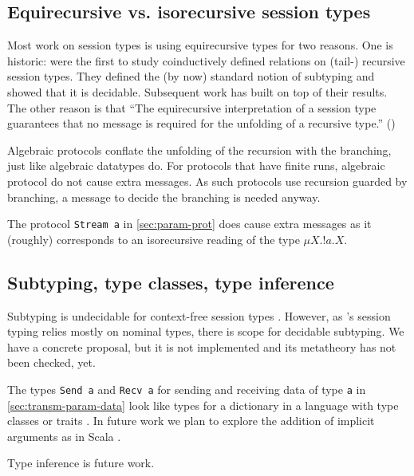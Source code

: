 \subsection{Equirecursive vs. isorecursive session types}
\label{sec:this-session-types}
Most work on session types is using equirecursive types for two reasons. One is historic:
\citet{DBLP:conf/esop/GayH99,DBLP:journals/acta/GayH05} were the first
to study coinductively defined relations on (tail-) recursive session types. They defined the (by now)
standard notion of subtyping and showed that it is
decidable. Subsequent work has built on top of their results. The
other reason is that ``The equirecursive interpretation of a session type guarantees that no
message is required for the unfolding of a recursive type.'' (\citet{DBLP:journals/pacmpl/BalzerP17})

Algebraic protocols conflate the unfolding of the recursion with
the branching, just like algebraic datatypes do.
For protocols that have finite runs, algebraic protocol do not cause extra messages.
As such protocols use recursion guarded by branching, a
message to decide the branching is needed anyway.

The protocol \lstinline+Stream a+ in \cref{sec:param-prot} does cause
extra messages as it (roughly) corresponds to an isorecursive reading of the type $\mu X. !a.X$.

\subsection{Subtyping, type classes, type inference}
\label{sec:can-you-do}

Subtyping is undecidable for context-free session types
\cite{DBLP:journals/toplas/Padovani19}. However, as \algst's session
typing relies mostly on nominal types, there is scope for decidable
subtyping. We have a concrete proposal, but it is not implemented
and its metatheory has not been checked, yet.

The types \lstinline+Send a+ and \lstinline+Recv a+ for sending and
receiving data of type \lstinline+a+ in \cref{sec:transm-param-data}
look like types for a dictionary in a language with type classes or
traits
\cite{DBLP:journals/toplas/HallHJW96,steve18:_rust_progr_languag}. 
%
In future work we plan to explore the addition of implicit arguments as
in Scala \cite{DBLP:journals/pacmpl/OderskyBLBMS18}. 

Type inference is future work.

